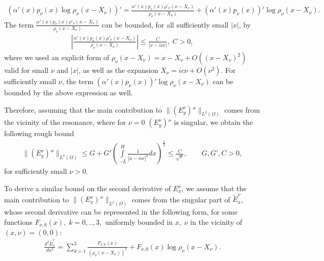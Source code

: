 \begin{align*}
 \left(\alpha'(x)p_{\nu}(x)\log\rho_{\nu}(x-X_{\nu})\right)'=\frac{\alpha'(x)p_{\nu}(x)\rho'_{\nu}(x-X_{\nu})}{\rho_{\nu}(x-X_{\nu})}+(\alpha'(x)p_{\nu}(x))'\log\rho_{\nu}(x-X_{\nu}).
\end{align*}
The term $\frac{\alpha'(x)p_{\nu}(x)\rho'_{\nu}(x-X_{\nu})}{\rho_{\nu}(x-X_{\nu})}$ can be bounded, for all sufficiently small $|x|$, by 
\begin{align*}
 \left|\frac{\alpha'(x)p_{\nu}(x)\rho'_{\nu}(x-X_{\nu})}{\rho_{\nu}(x-X_{\nu})}\right|\leq \frac{C}{|x-i\nu c|},\; C>0,
\end{align*}
where we used an explicit form of $\rho_{\nu}(x-X_{\nu})=x-X_{\nu}+O((x-X_{\nu})^2)$ valid for small $\nu$ and $|x|$, as well as 
the expansion $X_{\nu}=ic\nu+O(\nu^2)$.  For sufficiently small $\nu$, the term $(\alpha'(x)p_{\nu}(x))'\log\rho_{\nu}(x-X_{\nu})$ 
can be bounded by the above expression as well.

Therefore, assuming that the main contribution to $\|\left(E_{y}^{\nu}\right)''\|_{L^{2}(\Omega)}$ comes from the vicinity of the resonance, 
where for $\nu=0$ $\left(E_{y}^{\nu}\right)''$ is singular,  
we obtain the following rough bound
\begin{align*}
 \|\left(E_{y}^{\nu}\right)''\|_{L^{2}(\Omega)}\leq G+G'\left(\int\limits_{-L}^{H}\frac{1}{|x-i\nu c|^2}dx\right)^{\frac{1}{2}}
 \leq \frac{C}{\sqrt{\nu}},\qquad G,G',C>0,
\end{align*}
for sufficiently small $\nu>0$.

To derive a similar bound on the second derivative of $E_{x}^{\nu}$, we assume that the main contribution to $\|\left(E_{x}^{\nu}\right)''\|_{L^{2}(\Omega)}$
comes from the singular part of $\tilde{E}_{x}^{\nu}$, whose second derivative can be represented in the following form, 
for some functions $F_{\nu,k}(x),\; k=0,..,3,$ uniformly bounded in $x,\; \nu$ in the vicinity of $(x,\nu)=(0,0)$:
\begin{align}
\label{eq:ex_eq1}
 \frac{d^2\tilde{E}_x^{\nu}}{dx^2}=\sum\limits_{k=1}^{3}\frac{F_{\nu,k}(x)}{\left(\rho_{\nu}(x-X_{\nu})\right)^{k}}+F_{\nu,0}(x)\log\rho_{\nu}(x-X_{\nu}).
\end{align}

